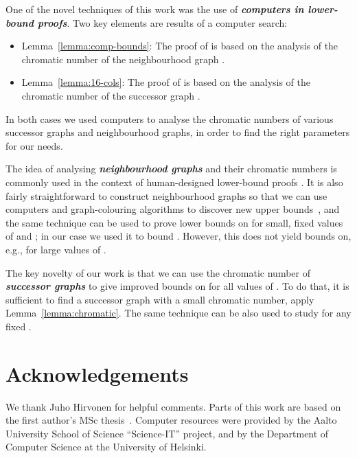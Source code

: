 \documentclass[a4paper,11pt]{article}
\theoremstyle{remark}
\begin{document}
One of the novel techniques of this work was the use of \emph{\textbf{computers in lower-bound proofs}}. Two key elements are results of a computer search:
\begin{itemize}
    \item Lemma~\ref{lemma:comp-bounds}: The proof of  is based on the analysis of the chromatic number of the neighbourhood graph .
    \item Lemma~\ref{lemma:16-cols}: The proof of  is based on the analysis of the chromatic number of the successor graph .
\end{itemize}
In both cases we used computers to analyse the chromatic numbers of various successor graphs and neighbourhood graphs, in order to find the right parameters for our needs.

The idea of analysing \emph{\textbf{neighbourhood graphs}} and their chromatic numbers is commonly used in the context of human-designed lower-bound proofs \cite{linial92locality,naor91lower,kuhn06complexity,fraigniaud07distributed}. It is also fairly straightforward to construct neighbourhood graphs so that we can use computers and graph-colouring algorithms to discover new upper bounds~\cite{rybicki11msc}, and the same technique can be used to prove lower bounds on  for small, fixed values of  and ; in our case we used it to bound . However, this does not yield bounds on, e.g.,  for large values of .

The key novelty of our work is that we can use the chromatic number of \emph{\textbf{successor graphs}} to give improved bounds on  for all values of . To do that, it is sufficient to find a successor graph  with a small chromatic number, apply Lemma~\ref{lemma:chromatic}. The same technique can be also used to study  for any fixed .


\section*{Acknowledgements}

We thank Juho Hirvonen for helpful comments. Parts of this work are based on the first author's MSc thesis~\cite{rybicki11msc}. Computer resources were provided by the Aalto University School of Science ``Science-IT'' project, and by the Department of Computer Science at the University of Helsinki.



\end{document}
